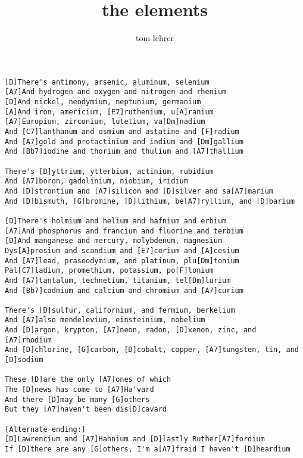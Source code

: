 \author{tom lehrer}
\title{the elements}
\maketitle
\begin{verbatim}
[D]There's antimony, arsenic, aluminum, selenium
[A7]And hydrogen and oxygen and nitrogen and rhenium
[D]And nickel, neodymium, neptunium, germanium
[A]And iron, americium, [E7]ruthenium, u[A]ranium
[A7]Europium, zirconium, lutetium, va[Dm]nadium
And [C7]lanthanum and osmium and astatine and [F]radium
And [A7]gold and protactinium and indium and [Dm]gallium
And [Bb7]iodine and thorium and thulium and [A7]thallium

There's [D]yttrium, ytterbium, actinium, rubidium
And [A7]boron, gadolinium, niobium, iridium
And [D]strontium and [A7]silicon and [D]silver and sa[A7]marium
And [D]bismuth, [G]bromine, [D]lithium, be[A7]ryllium, and [D]barium

[D]There's holmium and helium and hafnium and erbium
[A7]And phosphorus and francium and fluorine and terbium
[D]And manganese and mercury, molybdenum, magnesium
Dys[A]prosium and scandium and [E7]cerium and [A]cesium
And [A7]lead, praseodymium, and platinum, plu[Dm]tonium
Pal[C7]ladium, promethium, potassium, po[F]lonium
And [A7]tantalum, technetium, titanium, tel[Dm]lurium
And [Bb7]cadmium and calcium and chromium and [A7]curium

There's [D]sulfur, californium, and fermium, berkelium
And [A7]also mendelevium, einsteinium, nobelium
And [D]argon, krypton, [A7]neon, radon, [D]xenon, zinc, and [A7]rhodium
And [D]chlorine, [G]carbon, [D]cobalt, copper, [A7]tungsten, tin, and [D]sodium

These [D]are the only [A7]ones of which
The [D]news has come to [A7]Ha'vard
And there [D]may be many [G]others
But they [A7]haven't been dis[D]cavard

[Alternate ending:]
[D]Lawrencium and [A7]Hahnium and [D]lastly Ruther[A7]fordium
If [D]there are any [G]others, I'm a[A7]fraid I haven't [D]heardium
\end{verbatim}